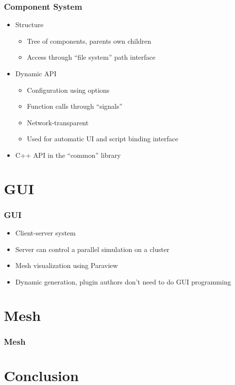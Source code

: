 \documentclass{beamer}
\begin{document}
\begin{frame}
 \frametitle{Component System}
\begin{itemize}
 \item Structure
 \begin{itemize}
  \item Tree of components, parents own children
  \item Access through ``file system'' path interface
 \end{itemize}
 \item Dynamic API
 \begin{itemize}
  \item Configuration using options
  \item Function calls through ``signals''
  \item Network-transparent
  \item Used for automatic UI and script binding interface
 \end{itemize}
 \item C++ API in the ``common'' library
\end{itemize}
\end{frame}

\section{GUI}

\begin{frame}
 \frametitle{GUI}
 \begin{itemize}
  \item Client-server system
  \item Server can control a parallel simulation on a cluster
  \item Mesh visualization using Paraview
  \item Dynamic generation, plugin authors don't need to do GUI programming
 \end{itemize}
\end{frame}

\section{Mesh}

\begin{frame}
 \frametitle{Mesh}
\end{frame}

\section{Conclusion}
\end{document}
